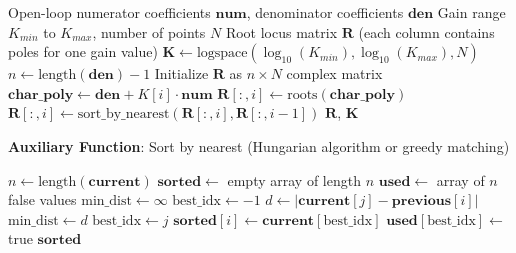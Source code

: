 \begin{algorithm}[H]
\caption{Root Locus Computation}
\label{alg:root_locus}
\begin{algorithmic}[1]
\REQUIRE Open-loop numerator coefficients $\mathbf{num}$, denominator coefficients $\mathbf{den}$
\REQUIRE Gain range $K_{min}$ to $K_{max}$, number of points $N$
\ENSURE Root locus matrix $\mathbf{R}$ (each column contains poles for one gain value)
\STATE
\STATE {}
\STATE $\mathbf{K} \gets \text{logspace}(\log_{10}(K_{min}), \log_{10}(K_{max}), N)$
\STATE
\STATE {}
\STATE $n \gets \text{length}(\mathbf{den}) - 1$
\STATE Initialize $\mathbf{R}$ as $n \times N$ complex matrix
\STATE
{}
    \STATE {}
    \STATE $\mathbf{char\_poly} \gets \mathbf{den} + K[i] \cdot \mathbf{num}$
    \STATE {}
    \STATE
    \STATE {}
    \STATE $\mathbf{R}[:, i] \gets \text{roots}(\mathbf{char\_poly})$
    \STATE
    \STATE {}
        \STATE $\mathbf{R}[:, i] \gets \text{sort\_by\_nearest}(\mathbf{R}[:, i], \mathbf{R}[:, i-1])$
    \ENDIF
\ENDFOR
\STATE
\RETURN $\mathbf{R}$, $\mathbf{K}$
\end{algorithmic}
\end{algorithm}

\textbf{Auxiliary Function}: Sort by nearest (Hungarian algorithm or greedy matching)

\begin{algorithm}[H]
\caption{Sort Roots by Nearest Match}
\label{alg:sort_nearest}
\begin{algorithmic}[1]
    \STATE $n \gets \text{length}(\mathbf{current})$
    \STATE $\mathbf{sorted} \gets$ empty array of length $n$
    \STATE $\mathbf{used} \gets$ array of $n$ false values
    \STATE
        \STATE $\text{min\_dist} \gets \infty$
        \STATE $\text{best\_idx} \gets -1$
                \STATE $d \gets |\mathbf{current}[j] - \mathbf{previous}[i]|$
                    \STATE $\text{min\_dist} \gets d$
                    \STATE $\text{best\_idx} \gets j$
                \ENDIF
            \ENDIF
        \ENDFOR
        \STATE $\mathbf{sorted}[i] \gets \mathbf{current}[\text{best\_idx}]$
        \STATE $\mathbf{used}[\text{best\_idx}] \gets$ true
    \ENDFOR
    \RETURN $\mathbf{sorted}$
\ENDFUNCTION
\end{algorithmic}
\end{algorithm}

